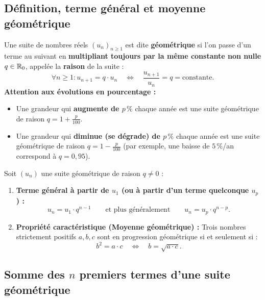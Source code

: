 \subsection{Définition, terme général et moyenne géométrique}

\begin{definition}
Une suite de nombres réels $(u_n)_{n \ge 1}$ est dite \textbf{géométrique} si l'on passe d'un terme au suivant en \textbf{multipliant toujours par la même constante non nulle} $q \in \mathbb{R}_0$, appelée la \textbf{raison} de la suite :
\[
    \boxed{\forall n \ge 1 : u_{n+1} = q \cdot u_n \quad \Longleftrightarrow \quad \frac{u_{n+1}}{u_n} = q = \text{constante}}.
\]
\textbf{Attention aux évolutions en pourcentage :}
\begin{itemize}
    \item Une grandeur qui \textbf{augmente de $p\,\%$} chaque année est une suite géométrique de raison $\boxed{q = 1 + \frac{p}{100}}$.
    \item Une grandeur qui \textbf{diminue (se dégrade) de $p\,\%$} chaque année est une suite géométrique de raison $\boxed{q = 1 - \frac{p}{100}}$ (par exemple, une baisse de $5\,\%$/an correspond à $q = 0,95$).
\end{itemize}
\end{definition}

\begin{theoreme}
Soit $(u_n)$ une suite géométrique de raison $q \neq 0$ :
\begin{enumerate}
    \item \textbf{Terme général à partir de $u_1$ (ou à partir d'un terme quelconque $u_p$) :}
    \[
        \boxed{u_n = u_1 \cdot q^{n-1}} \qquad \text{et plus généralement} \qquad \boxed{u_n = u_p \cdot q^{n-p}}.
    \]
    \item \textbf{Propriété caractéristique (Moyenne géométrique) :} Trois nombres strictement positifs $a, b, c$ sont en progression géométrique si et seulement si :
    \[
        \boxed{b^2 = a \cdot c \quad \Longleftrightarrow \quad b = \sqrt{a \cdot c}}.
    \]
\end{enumerate}
\end{theoreme}

\subsection{Somme des $n$ premiers termes d'une suite géométrique}

